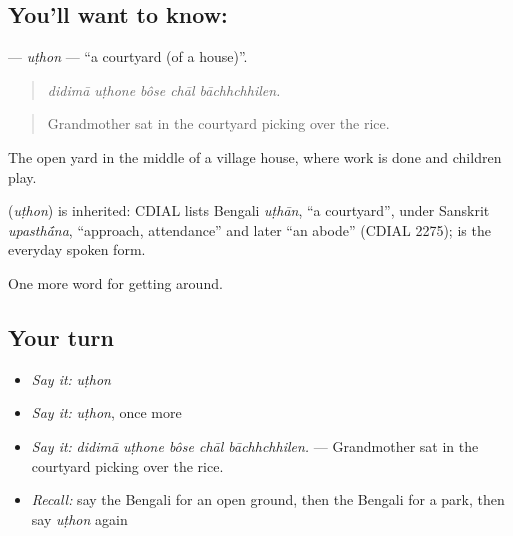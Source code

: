 \subsection*{You'll want to know: }
\textbf{} — \emph{uṭhon} — \textquotedblleft{}a courtyard (of a house)\textquotedblright{}.

\begin{quote}
    
\end{quote}

\begin{quote}
\emph{didimā uṭhone bôse chāl bāchhchhilen.}
\end{quote}

\begin{quote}
Grandmother sat in the courtyard picking over the rice.
\end{quote}

The open yard in the middle of a village house, where work is done and children play.

\begin{cousinweb}
\textbf{} (\emph{uṭhon}) is inherited: CDIAL lists Bengali \emph{uṭhān}, \textquotedblleft{}a courtyard\textquotedblright{}, under Sanskrit \emph{upasth\'{\={a}}na}, \textquotedblleft{}approach, attendance\textquotedblright{} and later \textquotedblleft{}an abode\textquotedblright{} (CDIAL 2275);  is the everyday spoken form.
\end{cousinweb}

\begin{grammarlens}[title={What you've built}]
One more word for getting around.
\end{grammarlens}

\subsection*{Your turn}
\begin{itemize}
\raggedright
  \item \emph{Say it:} \emph{uṭhon}
  \item \emph{Say it:} \emph{uṭhon}, once more
  \item \emph{Say it:} \emph{didimā uṭhone bôse chāl bāchhchhilen.} — Grandmother sat in the courtyard picking over the rice.
  \item \emph{Recall:} say the Bengali for an open ground, then the Bengali for a park, then say \emph{uṭhon} again
\end{itemize}

